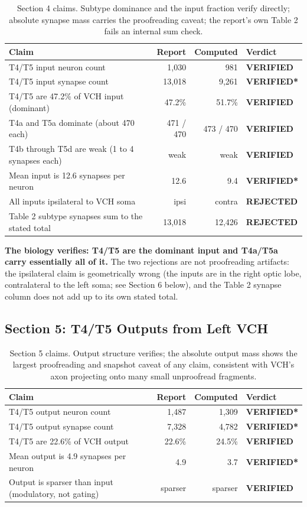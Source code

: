\documentclass[11pt]{article}
\newcommand{\key}[1]{\textbf{#1}}
\newcommand{\Verify}{\textcolor{vgreen}{\textbf{VERIFIED}}}
\newcommand{\Caveat}{\textcolor{vamber}{\textbf{VERIFIED*}}}
\newcommand{\Reject}{\textcolor{vred}{\textbf{REJECTED}}}
\begin{document}
\begin{table}[H]
\centering
\caption{Section 4 claims. Subtype dominance and the input fraction verify directly;
absolute synapse mass carries the proofreading caveat; the report's own Table 2 fails an
internal sum check.}
\begin{tabular}{p{6.6cm}rrl}
\toprule
Claim & Report & Computed & Verdict \\
\midrule
T4/T5 input neuron count & 1{,}030 & 981 & \Verify \\
T4/T5 input synapse count & 13{,}018 & 9{,}261 & \Caveat \\
T4/T5 are 47.2\% of VCH input (dominant) & 47.2\% & 51.7\% & \Verify \\
T4a and T5a dominate (about 470 each) & 471 / 470 & 473 / 470 & \Verify \\
T4b through T5d are weak (1 to 4 synapses each) & weak & weak & \Verify \\
Mean input is 12.6 synapses per neuron & 12.6 & 9.4 & \Caveat \\
All inputs ipsilateral to VCH soma & ipsi & contra & \Reject \\
Table 2 subtype synapses sum to the stated total & 13{,}018 & 12{,}426 & \Reject \\
\bottomrule
\end{tabular}
\end{table}

\key{The biology verifies: T4/T5 are the dominant input and T4a/T5a carry essentially all
of it.} The two rejections are not proofreading artifacts: the ipsilateral claim is
geometrically wrong (the inputs are in the right optic lobe, contralateral to the left
soma; see Section 6 below), and the Table 2 synapse column does not add up to its own
stated total.

\subsection*{Section 5: T4/T5 Outputs from Left VCH}

\begin{table}[H]
\centering
\caption{Section 5 claims. Output structure verifies; the absolute output mass shows the
largest proofreading and snapshot caveat of any claim, consistent with VCH's axon
projecting onto many small unproofread fragments.}
\begin{tabular}{p{6.6cm}rrl}
\toprule
Claim & Report & Computed & Verdict \\
\midrule
T4/T5 output neuron count & 1{,}487 & 1{,}309 & \Caveat \\
T4/T5 output synapse count & 7{,}328 & 4{,}782 & \Caveat \\
T4/T5 are 22.6\% of VCH output & 22.6\% & 24.5\% & \Verify \\
Mean output is 4.9 synapses per neuron & 4.9 & 3.7 & \Caveat \\
Output is sparser than input (modulatory, not gating) & sparser & sparser & \Verify \\
\bottomrule
\end{tabular}
\end{table}
\end{document}
